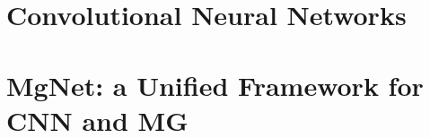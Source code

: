 \chapter{Convolutional Neural Networks}









\chapter{MgNet: a Unified Framework for CNN and MG}












